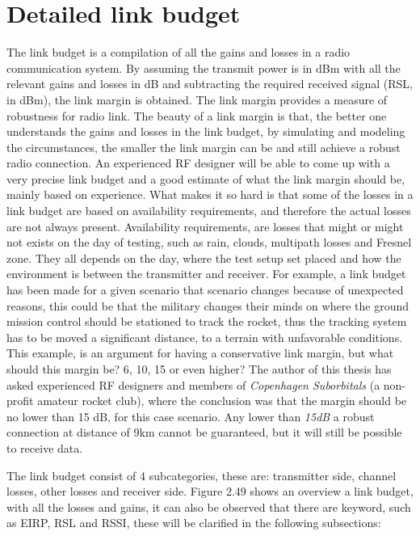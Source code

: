 \newpage

\section{Detailed link budget}
The link budget is a compilation of all the gains and losses in a radio communication system. By assuming the transmit power is in dBm with all the relevant gains and losses in dB and subtracting the required received signal (RSL, in dBm), the link margin is obtained. The link margin provides a measure of robustness for radio link. The beauty of a link margin is that, the better one understands the gains and losses in the link budget, by simulating and modeling the circumstances, the smaller the link margin can be and still achieve a robust radio connection. An experienced RF designer will be able to come up with a very precise link budget and a good estimate of what the link margin should be, mainly based on experience. What makes it so hard is that some of the losses in a link budget are based on availability requirements, and therefore the actual losses are not always present. Availability requirements, are losses that might or might not exists on the day of testing, such as rain, clouds, multipath losses and Fresnel zone. They all depends on the day, where the test setup set placed and how the environment is between the transmitter and receiver. For example, a link budget has been made for a given scenario that scenario changes because of unexpected reasons, this could be that the military changes their minds on where the ground mission control should be stationed to track the rocket, thus the tracking system has to be moved a significant distance, to a terrain with unfavorable conditions. This example, is an argument for having a conservative link margin, but what should this margin be? 6, 10, 15 or even higher? The author of this thesis has asked experienced RF designers and members of \textit{Copenhagen Suborbitals}\cite{CopenhagenSuborbitals} (a non-profit amateur rocket club), where the conclusion was that the margin should be no lower than 15 dB, for this case scenario. Any lower than \textit{15dB} a robust connection at distance of 9km cannot be guaranteed, but it will still be possible to receive data.

The link budget consist of 4 subcategories, these are: transmitter side, channel losses, other losses and receiver side. Figure 2.49 shows an overview a link budget, with all the losses and gains, it can also be observed that there are keyword, such as EIRP, RSL and RSSI, these will be clarified in the following subsections: 

